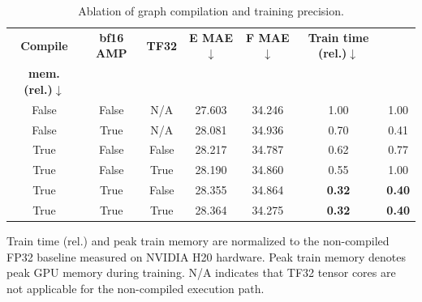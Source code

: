 \begin{table}[ht]
    \centering
    \scriptsize
    \begin{threeparttable}
        \caption{Ablation of graph compilation and training precision.}
        \label{tab:dpa4_compile_ablation}
        \begin{tabular}{@{}ccccccc@{}}
            \toprule
            \textbf{Compile}                       &
            \textbf{bf16 AMP}                      &
            \textbf{TF32}                          &
            \textbf{E MAE}$\downarrow$             &
            \textbf{F MAE}$\downarrow$             &
            \textbf{Train time (rel.)}$\downarrow$ &
            \makecell{\textbf{Peak train}\\\textbf{mem. (rel.)}$\downarrow$}                                         \\
            \midrule
            False                                  & False & N/A   & 27.603 & 34.246 & 1.00          & 1.00          \\
            False                                  & True  & N/A   & 28.081 & 34.936 & 0.70          & 0.41          \\
            True                                   & False & False & 28.217 & 34.787 & 0.62          & 0.77          \\
            True                                   & False & True  & 28.190 & 34.860 & 0.55          & 1.00          \\
            True                                   & True  & False & 28.355 & 34.864 & \textbf{0.32} & \textbf{0.40} \\
            True                                   & True  & True  & 28.364 & 34.275 & \textbf{0.32} & \textbf{0.40} \\
            \bottomrule
        \end{tabular}
        \begin{tablenotes}
            \item[a] Train time (rel.) and peak train memory are normalized to the non-compiled
            FP32 baseline measured on NVIDIA H20 hardware. Peak train memory denotes peak
            GPU memory during training. N/A indicates that TF32 tensor cores are not
            applicable for the non-compiled execution path.
        \end{tablenotes}
    \end{threeparttable}
\end{table}

